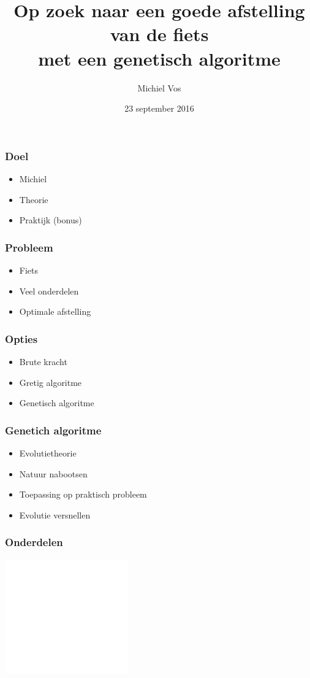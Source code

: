 \documentclass{beamer}
\title{Op zoek naar een goede afstelling van de fiets\\
met een genetisch algoritme}
\author{Michiel Vos}
\date{23 september 2016}
\begin{document}
\begin{frame}
  \titlepage
\end{frame}

\begin{frame}
  \frametitle{Doel}
  \begin{itemize}
      \item Michiel
      \item Theorie
      \item Praktijk (bonus)
  \end{itemize}
\end{frame}

\begin{frame}
  \frametitle{Probleem}
  \begin{itemize}
      \item Fiets 
      \item Veel onderdelen
      \item Optimale afstelling 
  \end{itemize}
\end{frame}

\begin{frame}
  \frametitle{Opties}
  \begin{itemize}
      \item Brute kracht
      \item Gretig algoritme
      \item Genetisch algoritme
  \end{itemize}
\end{frame}

\begin{frame}
  \frametitle{Genetich algoritme}
  \begin{itemize}
      \item Evolutietheorie
      \item Natuur nabootsen
      \item Toepassing op praktisch probleem
      \item Evolutie versnellen
  \end{itemize}
\end{frame}

\begin{frame}
  \frametitle{Onderdelen}
  \begin{center}
    \includegraphics[width=200px]{michiel.png}
  \end{center}
\end{frame}
\end{document}
